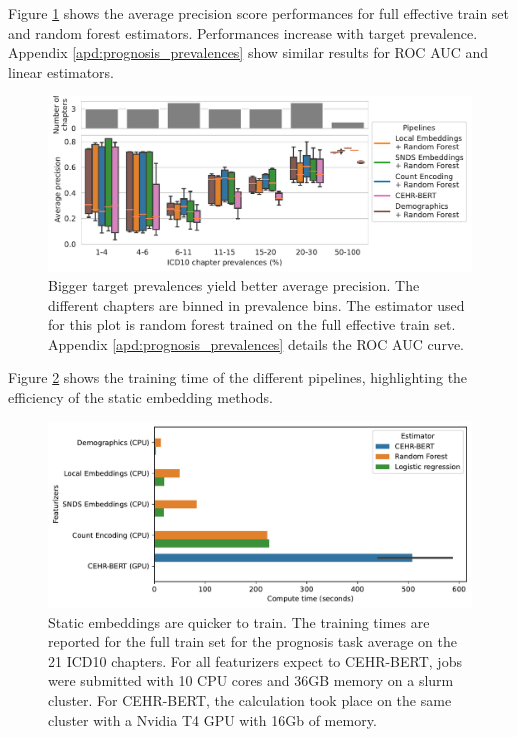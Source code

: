 \documentclass[french,12pt,twoside,a4paper]{book}
\begin{document}
Figure \ref{fig:prognosis_prevalences_auprc} shows the average precision score
performances for full effective train set and random forest estimators.
Performances increase with target prevalence. Appendix
\ref{apd:prognosis_prevalences} show similar results for ROC AUC and
linear estimators.


\begin{figure}[!h]
  \centering
  \includegraphics[width=0.8\linewidth]{img/chapter_3/prognosis/prevalence_results__est_random_forests_boxplot_average_precision_score_xlog.pdf}
  \caption{ Bigger target prevalences yield better average precision. The
    different chapters are binned in prevalence bins. The estimator used for
    this plot is random forest trained on the full effective train set. Appendix \ref{apd:prognosis_prevalences} details
    the ROC AUC curve.}%
  \label{fig:prognosis_prevalences_auprc}
\end{figure}

Figure \ref{fig:prognosis_training_time} shows the training time of the
different pipelines, highlighting the efficiency of the static embedding
methods.


\begin{figure}[!h]
  \centering
  \includegraphics[width=0.8\linewidth]{img/chapter_3/prognosis/training_testing_time_per_chapter.pdf}
  \caption{Static embeddings are quicker to train. The training times are
    reported for the full train set for the prognosis task average on the 21
    ICD10 chapters. For all featurizers expect to CEHR-BERT, jobs were submitted
    with 10 CPU cores and 36GB memory on a slurm cluster. For CEHR-BERT, the
    calculation took place on the same cluster with a Nvidia T4 GPU with 16Gb of
    memory.}%
  \label{fig:prognosis_training_time}
\end{figure}
\end{document}
